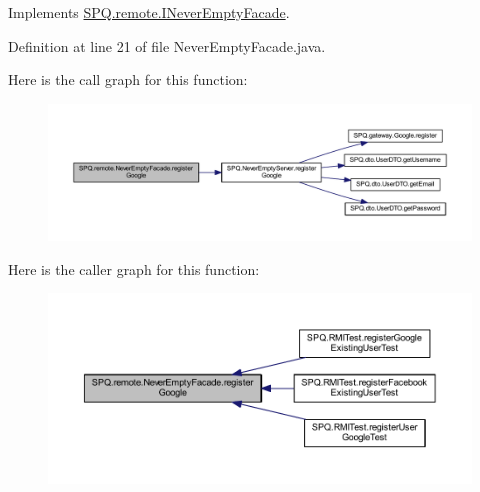 Implements \mbox{\hyperlink{interface_s_p_q_1_1remote_1_1_i_never_empty_facade_a93f3250c09a26fdb1d65219599dfd542}{S\+P\+Q.\+remote.\+I\+Never\+Empty\+Facade}}.



Definition at line 21 of file Never\+Empty\+Facade.\+java.

Here is the call graph for this function\+:\nopagebreak
\begin{figure}[H]
\begin{center}
\leavevmode
\includegraphics[width=350pt]{class_s_p_q_1_1remote_1_1_never_empty_facade_aaa8d4a6148957029af068d00da24890b_cgraph}
\end{center}
\end{figure}
Here is the caller graph for this function\+:\nopagebreak
\begin{figure}[H]
\begin{center}
\leavevmode
\includegraphics[width=350pt]{class_s_p_q_1_1remote_1_1_never_empty_facade_aaa8d4a6148957029af068d00da24890b_icgraph}
\end{center}
\end{figure}
\mbox{\label{class_s_p_q_1_1remote_1_1_never_empty_facade_a52a0feff1dfb3347e55e46c3ac48fafc}} 
